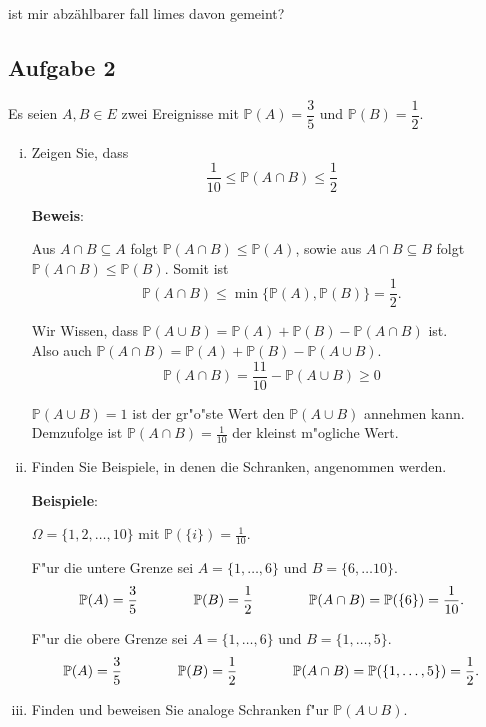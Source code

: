 \documentclass[11pt,a4paper,ngerman]{article}
\newcommand{\set}[1]{ \{ #1 \}}
\newcommand{\Prob}{\mathbb{P}}
\begin{document}
ist mir abzählbarer fall limes davon gemeint?

\subsection*{Aufgabe 2} 
Es seien $A, B \in E$ zwei Ereignisse mit $\Prob(A) = \dfrac{3}{5}$ und
$\Prob(B) = \dfrac{1}{2}.$

\begin{enumerate}[(i)]
  \item Zeigen Sie, dass \[
      \dfrac{1}{10} \le \Prob(A \cap B) \le \dfrac{1}{2}
    \]

    \textbf{Beweis}:

    Aus $A \cap B \subseteq A$ folgt $\Prob(A \cap B) \le \Prob(A)$, sowie aus
    $A \cap B \subseteq B$ folgt $\Prob(A \cap B) \le \Prob(B)$. Somit ist \[
      \Prob(A \cap B) \le \min\set{\Prob(A), \Prob(B)} = \dfrac{1}{2}.
    \]

    Wir Wissen, dass $\Prob(A\cup B) = \Prob(A) + \Prob(B) - \Prob(A\cap B)$ ist.\\
    Also auch $\Prob(A\cap B) = \Prob(A) + \Prob(B) - \Prob(A\cup B)$.
    \[
      \Prob(A\cap B) = \dfrac{11}{10} - \Prob(A\cup B) \ge 0
    \]

    $\Prob(A\cup B) = 1$ ist der gr"o"ste Wert den $\Prob(A\cup B)$ annehmen
    kann. Demzufolge ist $\Prob(A\cap B) = \frac{1}{10}$ der kleinst m"ogliche
    Wert.

  \item Finden Sie Beispiele, in denen die Schranken, angenommen werden.

    \textbf{Beispiele}:

    $\Omega = \set{1,2,\ldots,10}$ mit $\Prob(\set i) = \frac{1}{10}$.

    F"ur die untere Grenze sei $A = \set{1,\ldots,6}$ und
    $B = \set{6, \ldots 10}$. \[
      \Prob(A) = \dfrac{3}{5} \\ \qquad\qquad
      \Prob(B) = \dfrac{1}{2} \\ \qquad\qquad
      \Prob(A\cap B) = \Prob(\set 6) = \dfrac{1}{10}.
    \]

    F"ur die obere Grenze sei $A = \set{1,\ldots,6}$ und
    $B = \set{1,\ldots, 5}$. \[
      \Prob(A) = \dfrac{3}{5} \\ \qquad\qquad
      \Prob(B) = \dfrac{1}{2} \\ \qquad\qquad
      \Prob(A\cap B) = \Prob(\set{1,\ldots,5}) = \dfrac{1}{2}.
    \]

  \item Finden und beweisen Sie analoge Schranken f"ur $\Prob(A \cup B)$.


\end{enumerate}
\end{document}
